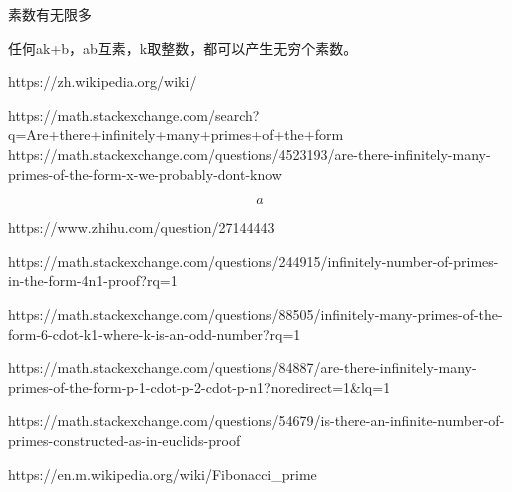 \usepackage{amsmath}
\usepackage[utf8]{inputenc}
\usepackage[T1]{fontenc}



素数有无限多

任何ak+b，ab互素，k取整数，都可以产生无穷个素数。

https://zh.wikipedia.org/wiki/%

https://math.stackexchange.com/search?q=Are+there+infinitely+many+primes+of+the+form
https://math.stackexchange.com/questions/4523193/are-there-infinitely-many-primes-of-the-form-x-we-probably-dont-know

$$
a
$$

https://www.zhihu.com/question/27144443

https://math.stackexchange.com/questions/244915/infinitely-number-of-primes-in-the-form-4n1-proof?rq=1

https://math.stackexchange.com/questions/88505/infinitely-many-primes-of-the-form-6-cdot-k1-where-k-is-an-odd-number?rq=1

https://math.stackexchange.com/questions/84887/are-there-infinitely-many-primes-of-the-form-p-1-cdot-p-2-cdot-p-n1?noredirect=1&lq=1


https://math.stackexchange.com/questions/54679/is-there-an-infinite-number-of-primes-constructed-as-in-euclids-proof

https://en.m.wikipedia.org/wiki/Fibonacci_prime